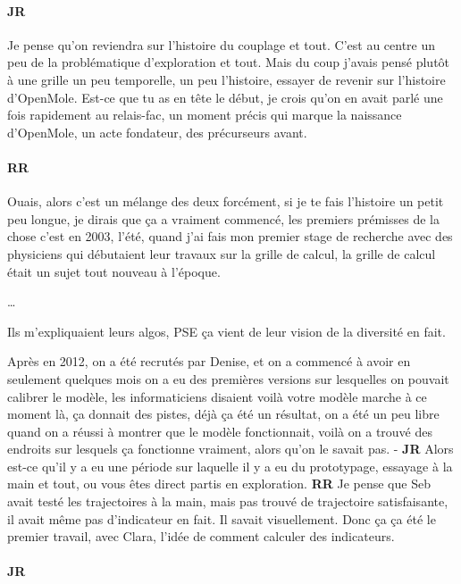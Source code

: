 \documentclass[12pt]{article}
\begin{document}
\paragraph{JR}

Je pense qu'on reviendra sur l'histoire du couplage et tout. C'est au centre un peu de la problématique d'exploration et tout. Mais du coup j'avais pensé plutôt à une grille un peu temporelle, un peu l'histoire, essayer de revenir sur l'histoire d'OpenMole. Est-ce que tu as en tête le début, je crois qu'on en avait parlé une fois rapidement au relais-fac, un moment précis qui marque la naissance d'OpenMole, un acte fondateur, des précurseurs avant.

\paragraph{RR}

Ouais, alors c'est un mélange des deux forcément, si je te fais l'histoire un petit peu longue, je dirais que ça a vraiment commencé, les premiers prémisses de la chose c'est en 2003, l'été, quand j'ai fais mon premier stage de recherche avec des physiciens qui débutaient leur travaux sur la grille de calcul, la grille de calcul était un sujet tout nouveau à l'époque.

\ldots


Ils m'expliquaient leurs algos, PSE ça vient de leur vision de la diversité en fait.

Après en 2012, on a été recrutés par Denise, et on a commencé à avoir en seulement quelques mois on a eu des premières versions sur lesquelles on pouvait calibrer le modèle, les informaticiens disaient voilà votre modèle marche à ce moment là, ça donnait des pistes, déjà ça été un résultat, on a été un peu libre quand on a réussi à montrer que le modèle fonctionnait, voilà on a trouvé des endroits sur lesquels ça fonctionne vraiment, alors qu'on le savait pas. - \textbf{JR} Alors est-ce qu'il y a eu une période sur laquelle il y a eu du prototypage, essayage à la main et tout, ou vous êtes direct partis en exploration. \textbf{RR} Je pense que Seb avait testé les trajectoires à la main, mais pas trouvé de trajectoire satisfaisante, il avait même pas d'indicateur en fait. Il savait visuellement. Donc ça ça été le premier travail, avec Clara, l'idée de comment calculer des indicateurs.

\paragraph{JR}
\end{document}
